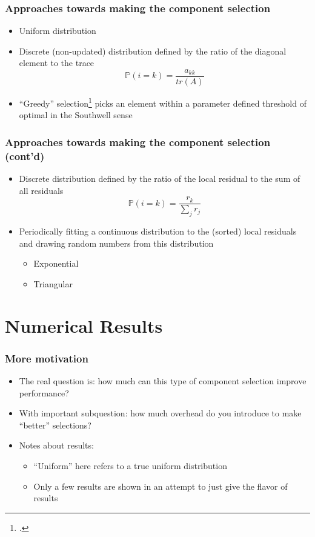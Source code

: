 \documentclass{beamer}
\begin{document}
\begin{frame}
	\frametitle{Approaches towards making the component selection}
	    \begin{itemize}
	        \item Uniform distribution
	        \item Discrete (non-updated) distribution defined by the ratio of the diagonal element to the trace
	            \begin{equation}
	                \mathbb{P}(i=k) = \frac{a_{kk}}{tr(A)}
	            \end{equation}
	        \item ``Greedy'' selection\footcite{griebel2012greedy} picks an element within a parameter defined threshold of optimal in the Southwell sense 
	    \end{itemize}
\end{frame}

\begin{frame}
	\frametitle{Approaches towards making the component selection (cont'd)}
	    \begin{itemize}
	        \item Discrete distribution defined by the ratio of the local residual to the sum of all residuals
	            \begin{equation}
	                \mathbb{P}(i=k) = \frac{r_{k}}{\sum_j r_j}
	            \end{equation}
	        \item Periodically fitting a continuous distribution to the (sorted) local residuals and drawing random numbers from this distribution
	            \begin{itemize}
	                \item Exponential
	                \item Triangular
	            \end{itemize}
	    \end{itemize}
\end{frame}

\section{Numerical Results}

\begin{frame}
	\frametitle{More motivation}
	\begin{itemize}
		\item The real question is: how much can this type of component selection improve performance?
		\item With important subquestion: how much overhead do you introduce to make ``better'' selections?
		\item Notes about results:
		    \begin{itemize}
		        \item ``Uniform'' here refers to a true uniform distribution
		        \item Only a few results are shown in an attempt to just give the flavor of results
		    \end{itemize}
	\end{itemize}
\end{frame}
\end{document}
